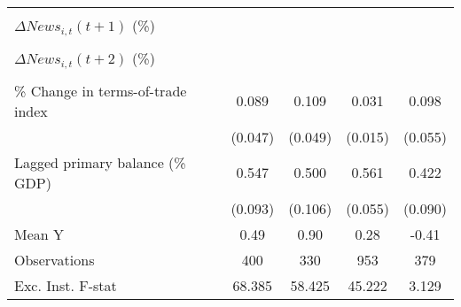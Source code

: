 {\begin{tabular}{l*{4}{c}}
                    &                     &                     &                     &                     \\
\addlinespace
$ \Delta News_{i,t}(t+1)$ (\%)&                     &                     &                     &                     \\
                    &                     &                     &                     &                     \\
\addlinespace
$ \Delta News_{i,t}(t+2)$ (\%)&                     &                     &                     &                     \\
                    &                     &                     &                     &                     \\
\addlinespace
\% Change in terms-of-trade index&       0.089\sym{*}  &       0.109\sym{**} &       0.031\sym{**} &       0.098\sym{*}  \\
                    &     (0.047)         &     (0.049)         &     (0.015)         &     (0.055)         \\
\addlinespace
Lagged primary balance (\% GDP)&       0.547\sym{***}&       0.500\sym{***}&       0.561\sym{***}&       0.422\sym{***}\\
                    &     (0.093)         &     (0.106)         &     (0.055)         &     (0.090)         \\
\midrule
Mean Y              &        0.49         &        0.90         &        0.28         &       -0.41         \\
Observations        &         400         &         330         &         953         &         379         \\
Exc. Inst. F-stat   &      68.385         &      58.425         &      45.222         &       3.129         \\
\bottomrule
\end{tabular}
}
